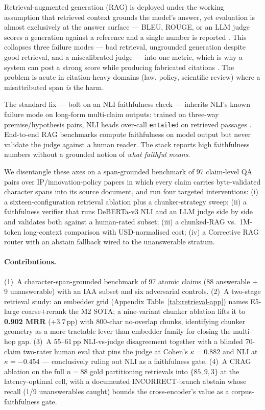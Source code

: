 \documentclass[11pt]{article}
\begin{document}
Retrieval-augmented generation (RAG) is deployed under the working assumption that retrieved context grounds the model's answer, yet evaluation is almost exclusively at the answer surface --- BLEU, ROUGE, or an LLM judge scores a generation against a reference and a single number is reported \citep{retrievalaugmentedgeneration,gao2024retrievalaugmented}. This collapses three failure modes --- bad retrieval, ungrounded generation despite good retrieval, and a miscalibrated judge --- into one metric, which is why a system can post a strong score while producing fabricated citations \citep{gao2023enabling,min-etal-2023-factscore}. The problem is acute in citation-heavy domains (law, policy, scientific review) where a misattributed span \emph{is} the harm.

The standard fix --- bolt on an NLI faithfulness check --- inherits NLI's known failure mode on long-form multi-claim outputs: trained on three-way premise/hypothesis pairs, NLI heads over-call \texttt{entailed} on retrieved passages \citep{min-etal-2023-factscore}. End-to-end RAG benchmarks \citep{es2024ragas,saadfalcon2024ares} compute faithfulness on model output but never validate the judge against a human reader. The stack reports high faithfulness numbers without a grounded notion of \emph{what faithful means}.

We disentangle these axes on a span-grounded benchmark of 97 claim-level QA pairs over IP/innovation-policy papers in which every claim carries byte-validated character spans into its source document, and run four targeted interventions: (i) a sixteen-configuration retrieval ablation plus a chunker-strategy sweep; (ii) a faithfulness verifier that runs DeBERTa-v3 NLI \citep{he2021debertav3} and an LLM judge side by side and validates both against a human-rated subset; (iii) a chunked-RAG vs.\ 1M-token long-context comparison with USD-normalised cost; (iv) a Corrective RAG router \citep{yan2024corrective} with an abstain fallback wired to the unanswerable stratum.

\paragraph{Contributions.} (1)~A character-span-grounded benchmark of 97 atomic claims (88 answerable + 9 unanswerable) with an IAA subset and six adversarial controls. (2)~A two-stage retrieval study: an embedder grid (Appendix Table~\ref{tab:retrieval-app}) names E5-large \citep{wang2024e5} coarse$+$rerank the M2 SOTA; a nine-variant chunker ablation lifts it to \textbf{0.902 MRR} ($+3.7$\,pp) with 800-char no-overlap chunks, identifying chunker geometry as a more tractable lever than embedder family for closing the multi-hop gap. (3)~A 55--61\,pp NLI-vs-judge disagreement together with a blinded 70-claim two-rater human eval that pins the judge at Cohen's $\kappa{=}0.882$ and NLI at $\kappa{=}-0.454$ \citep{cohen1960kappa} --- conclusively ruling out NLI as a faithfulness gate. (4)~A CRAG ablation on the full $n{=}88$ gold partitioning retrievals into $\{85, 9, 3\}$ at the latency-optimal cell, with a documented INCORRECT-branch abstain whose recall (1/9 unanswerables caught) bounds the cross-encoder's value as a corpus-faithfulness gate.
\end{document}
